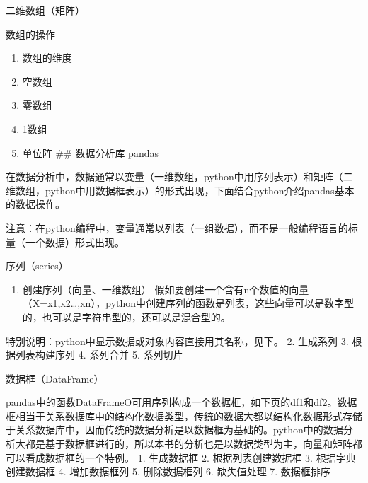 \documentclass[ignorenonframetext,11pt,xcolor=dvipsnames,aspectratio=1610,hyperref={bookmarksdepth=4}]{beamer}
\providecommand{\tightlist}{%
  \setlength{\itemsep}{0pt}\setlength{\parskip}{0pt}}
\begin{document}
\begin{frame}{二维数组（矩阵）}
\protect\hypertarget{section-3}{}

\end{frame}

\begin{frame}{数组的操作}
\protect\hypertarget{section-4}{}

\begin{enumerate}
\tightlist
\item
  数组的维度
\item
  空数组
\item
  零数组
\item
  1数组
\item
  单位阵 \#\# 数据分析库 pandas
\end{enumerate}

在数据分析中，数据通常以变量（一维数组，python中用序列表示）和矩阵（二维数组，python中用数据框表示）的形式出现，下面结合python介绍pandas基本的数据操作。

注意：在python编程中，变量通常以列表（一组数据），而不是一般编程语言的标量（一个数据）形式出现。

\end{frame}

\begin{frame}{序列（series）}
\protect\hypertarget{series}{}

\begin{enumerate}
\tightlist
\item
  创建序列（向量、一维数组）
  假如要创建一个含有n个数值的向量（X=x1,x2\ldots,xn），python中创建序列的函数是列表，这些向量可以是数字型的，也可以是字符串型的，还可以是混合型的。
\end{enumerate}

特别说明：python中显示数据或对象内容直接用其名称，见下。 2. 生成系列 3.
根据列表构建序列 4. 系列合并 5. 系列切片

\end{frame}

\begin{frame}{数据框（DataFrame）}
\protect\hypertarget{dataframe}{}

pandas中的函数DataFrameO可用序列构成一个数据框，如下页的df1和df2。数据框相当于关系数据库中的结构化数据类型，传统的数据大都以结构化数据形式存储于关系数据库中，因而传统的数据分析是以数据框为基础的。python中的数据分析大都是基于数据框进行的，所以本书的分析也是以数据类型为主，向量和矩阵都可以看成数据框的一个特例。
1. 生成数据框 2. 根据列表创建数据框 3. 根据字典创建数据框 4.
增加数据框列 5. 删除数据框列 6. 缺失值处理 7. 数据框排序

\end{frame}
\end{document}
